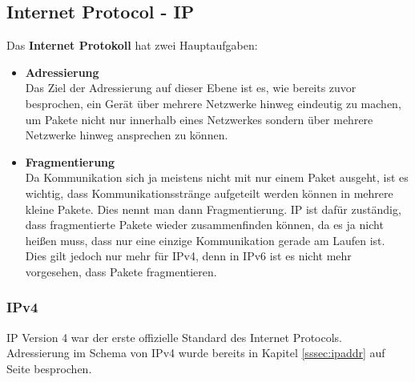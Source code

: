 \documentclass[12pt,a4paper]{report}
\begin{document}
\subsection{Internet Protocol - IP}\label{ssec:ip}
Das \textbf{Internet Protokoll} hat zwei Hauptaufgaben:
\begin{itemize}
\item \textbf{Adressierung}\\
Das Ziel der Adressierung auf dieser Ebene ist es, wie bereits zuvor besprochen, ein Gerät über mehrere Netzwerke hinweg eindeutig zu machen, um Pakete nicht nur innerhalb eines Netzwerkes sondern über mehrere Netzwerke hinweg ansprechen zu können.
\item \textbf{Fragmentierung}\\
Da Kommunikation sich ja meistens nicht mit nur einem Paket ausgeht, ist es wichtig, dass Kommunikationsstränge aufgeteilt werden können in mehrere kleine Pakete. Dies nennt man dann Fragmentierung. IP ist dafür zuständig, dass fragmentierte Pakete wieder zusammenfinden können, da es ja nicht heißen muss, dass nur eine einzige Kommunikation gerade am Laufen ist.\\
Dies gilt jedoch nur mehr für IPv4, denn in IPv6 ist es nicht mehr vorgesehen, dass Pakete fragmentieren.
\end{itemize}
\subsubsection{IPv4}
IP Version 4 war der erste offizielle Standard des Internet Protocols.\\
Adressierung im Schema von IPv4 wurde bereits in Kapitel \ref{sssec:ipaddr} auf Seite \pageref{sssec:ipaddr} besprochen.\\
\end{document}

